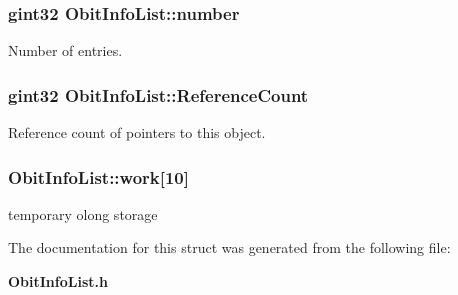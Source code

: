 \subsubsection{\setlength{\rightskip}{0pt plus 5cm}gint32 {\bf Obit\-Info\-List::number}}\label{structObitInfoList_o2}


Number of entries. 

\subsubsection{\setlength{\rightskip}{0pt plus 5cm}gint32 {\bf Obit\-Info\-List::Reference\-Count}}\label{structObitInfoList_o1}


Reference count of pointers to this object. 

\subsubsection{ {\bf Obit\-Info\-List::work}[10]}\label{structObitInfoList_o5}


temporary olong storage 



The documentation for this struct was generated from the following file:\begin{CompactItemize}
\item 
{\bf Obit\-Info\-List.h}\end{CompactItemize}

